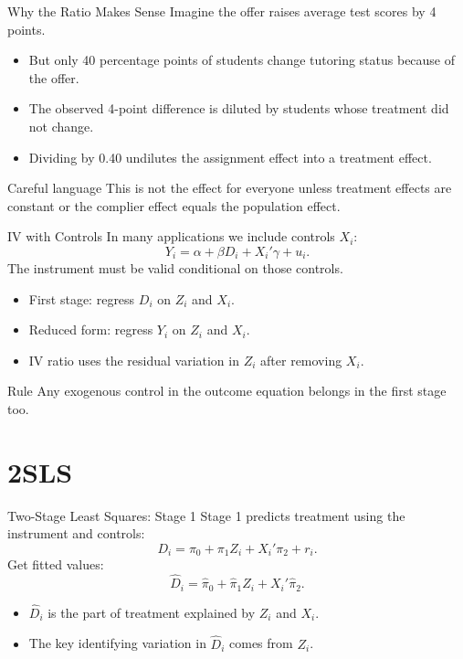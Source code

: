 \documentclass[11pt,aspectratio=169]{beamer}
\newcommand{\derivbutton}[1]{\vspace{0.4em}\hfill\hyperlink{app:#1}{\beamerbutton{Appendix details}}}
\begin{document}
\begin{frame}{Why the Ratio Makes Sense}
  Imagine the offer raises average test scores by 4 points.

  \begin{itemize}
    \item But only 40 percentage points of students change tutoring status because of the offer.
    \item The observed 4-point difference is diluted by students whose treatment did not change.
    \item Dividing by 0.40 undilutes the assignment effect into a treatment effect.
  \end{itemize}

  \begin{block}{Careful language}
    This is not the effect for everyone unless treatment effects are constant or the complier effect equals the population effect.
  \end{block}
\end{frame}

\begin{frame}{IV with Controls}
  In many applications we include controls \(X_i\):
  \[
    Y_i = \alpha + \beta D_i + X_i'\gamma + u_i.
  \]
  The instrument must be valid conditional on those controls.

  \begin{itemize}
    \item First stage: regress \(D_i\) on \(Z_i\) and \(X_i\).
    \item Reduced form: regress \(Y_i\) on \(Z_i\) and \(X_i\).
    \item IV ratio uses the residual variation in \(Z_i\) after removing \(X_i\).
  \end{itemize}

  \begin{block}{Rule}
    Any exogenous control in the outcome equation belongs in the first stage too.
  \end{block}

  \derivbutton{controls-proof}
\end{frame}

\section{2SLS}

\begin{frame}{Two-Stage Least Squares: Stage 1}
  \hypertarget{main:2sls}{}
  Stage 1 predicts treatment using the instrument and controls:
  \[
    D_i = \pi_0 + \pi_1 Z_i + X_i'\pi_2 + r_i.
  \]
  Get fitted values:
  \[
    \hat{D}_i = \hat{\pi}_0 + \hat{\pi}_1 Z_i + X_i'\hat{\pi}_2.
  \]

  \begin{itemize}
    \item \(\hat{D}_i\) is the part of treatment explained by \(Z_i\) and \(X_i\).
    \item The key identifying variation in \(\hat{D}_i\) comes from \(Z_i\).
  \end{itemize}
\end{frame}
\end{document}

